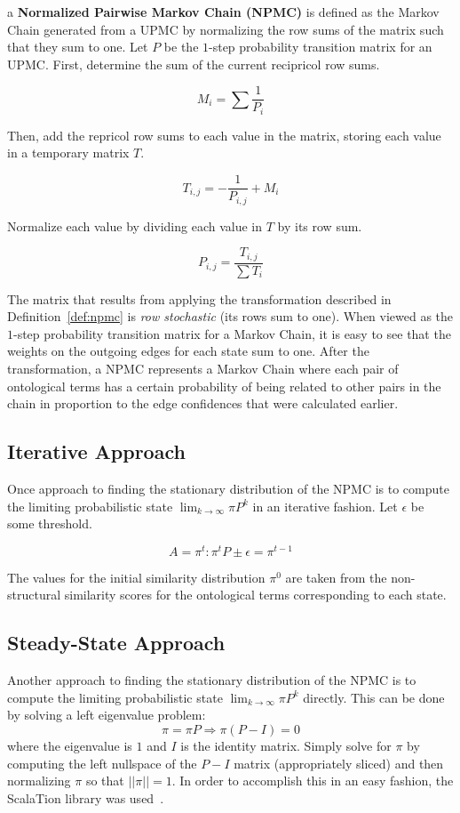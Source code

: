 \documentclass[letterpaper,twocolumn,12pt]{article}
\begin{document}
\begin{defn}
\label{def:npmc}
a {\bf Normalized Pairwise Markov Chain (NPMC)} is defined as the Markov Chain generated from a UPMC by normalizing the row sums of the matrix such that they sum to one. Let $P$ be the $1$-step probability transition matrix for an UPMC. First, determine the sum of the current recipricol row sums.

$$ M_i = \sum \frac{1}{P_i} $$

\noindent Then, add the repricol row sums to each value in the matrix, storing each value in a temporary matrix $T$.

$$ T_{i,j} = -\frac{1}{P_{i,j}} + M_i $$

\noindent Normalize each value by dividing each value in $T$ by its row sum.

$$ P_{i,j} = \frac{T_{i,j}}{\sum T_i} $$
\end{defn}

\noindent The matrix that results from applying the transformation described in Definition~\ref{def:npmc} is \textit{row stochastic} (its rows sum to one).
When viewed as the $1$-step probability transition matrix for a Markov Chain, it is easy to see that the weights on the outgoing edges for each state sum to one.
After the transformation, a NPMC represents a Markov Chain where each pair of ontological terms has a certain probability of being related to other pairs in the chain in proportion to the edge confidences that were calculated earlier.

\subsection{Iterative Approach}

Once approach to finding the stationary distribution of the NPMC is to compute the limiting probabilistic state $\lim_{k \to \infty} \pi P^k$ in an iterative fashion. 
Let $\epsilon$ be some threshold.

$$ A = \pi^t : \pi^t P \pm \epsilon = \pi^{t-1} $$

\noindent The values for the initial similarity distribution $\pi^0$ are taken from the non-structural similarity scores for the ontological terms corresponding to each state.

\subsection{Steady-State Approach}

Another approach to finding the stationary distribution of the NPMC is to compute the limiting probabilistic state $\lim_{k \to \infty} \pi P^k$ directly.
This can be done by solving a left eigenvalue problem: 
$$ \pi = \pi P \Rightarrow \pi (P - I) = 0$$
where the eigenvalue is $1$ and $I$ is the identity matrix. 
Simply solve for $\pi$ by computing the left nullspace of the $P - I$ matrix (appropriately sliced) and then normalizing $\pi$ so that $\vert\vert \pi \vert\vert = 1$.
In order to accomplish this in an easy fashion, the ScalaTion library was used~\cite{miller:2010:scalation}.
\end{document}
